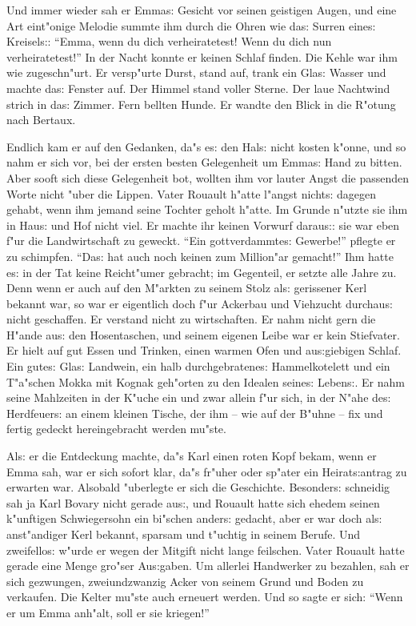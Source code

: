 \documentclass[oneside,12pt]{book}
\newcommand{\s}{s:}%
\begin{document}
Und immer wieder sah er Emma{\s} Gesicht vor seinen geistigen
Augen, und eine Art eint"onige Melodie summte ihm durch die Ohren
wie da{\s} Surren eine{\s} Kreisel{\s}: "`Emma, wenn du dich
verheiratetest! Wenn du dich nun verheiratetest!"' In der Nacht
konnte er keinen Schlaf finden. Die Kehle war ihm wie
zugeschn"urt. Er versp"urte Durst, stand auf, trank ein Gla{\s}
Wasser und machte da{\s} Fenster auf. Der Himmel stand voller
Sterne. Der laue Nachtwind strich in da{\s} Zimmer. Fern bellten
Hunde. Er wandte den Blick in die R"otung nach Bertaux.

Endlich kam er auf den Gedanken, da"s e{\s} den Hal{\s} nicht
kosten k"onne, und so nahm er sich vor, bei der ersten besten
Gelegenheit um Emma{\s} Hand zu bitten. Aber sooft sich diese
Gelegenheit bot, wollten ihm vor lauter Angst die passenden Worte
nicht "uber die Lippen. Vater Rouault h"atte l"angst nicht{\s}
dagegen gehabt, wenn ihm jemand seine Tochter geholt h"atte. Im
Grunde n"utzte sie ihm in Hau{\s} und Hof nicht viel. Er machte
ihr keinen Vorwurf darau{\s}: sie war eben f"ur die Landwirtschaft
zu geweckt. "`Ein gottverdammte{\s} Gewerbe!"' pflegte er zu
schimpfen. "`Da{\s} hat auch noch keinen zum Million"ar gemacht!"'
Ihm hatte e{\s} in der Tat keine Reicht"umer gebracht; im
Gegenteil, er setzte alle Jahre zu. Denn wenn er auch auf den
M"arkten zu seinem Stolz al{\s} gerissener Kerl bekannt war, so
war er eigentlich doch f"ur Ackerbau und Viehzucht durchau{\s}
nicht geschaffen. Er verstand nicht zu wirtschaften. Er nahm nicht
gern die H"ande au{\s} den Hosentaschen, und seinem eigenen Leibe
war er kein Stiefvater. Er hielt auf gut Essen und Trinken, einen
warmen Ofen und au{\s}giebigen Schlaf. Ein gute{\s} Gla{\s}
Landwein, ein halb durchgebratene{\s} Hammelkotelett und ein
T"a"schen Mokka mit Kognak geh"orten zu den Idealen seine{\s}
Leben{\s}. Er nahm seine Mahlzeiten in der K"uche ein und zwar
allein f"ur sich, in der N"ahe de{\s} Herdfeuer{\s} an einem
kleinen Tische, der ihm -- wie auf der B"uhne -- fix und fertig
gedeckt hereingebracht werden mu"ste.

Al{\s} er die Entdeckung machte, da"s Karl einen roten Kopf bekam,
wenn er Emma sah, war er sich sofort klar, da"s fr"uher oder
sp"ater ein Heirat{\s}antrag zu erwarten war. Alsobald "uberlegte
er sich die Geschichte. Besonder{\s} schneidig sah ja Karl Bovary
nicht gerade au{\s}, und Rouault hatte sich ehedem seinen
k"unftigen Schwiegersohn ein bi"schen ander{\s} gedacht, aber er
war doch al{\s} anst"andiger Kerl bekannt, sparsam und t"uchtig in
seinem Berufe. Und zweifello{\s} w"urde er wegen der Mitgift nicht
lange feilschen. Vater Rouault hatte gerade eine Menge gro"ser
Au{\s}gaben. Um allerlei Handwerker zu bezahlen, sah er sich
gezwungen, zweiundzwanzig Acker von seinem Grund und Boden zu
verkaufen. Die Kelter mu"ste auch erneuert werden. Und so sagte er
sich: "`Wenn er um Emma anh"alt, soll er sie kriegen!"'
\end{document}
